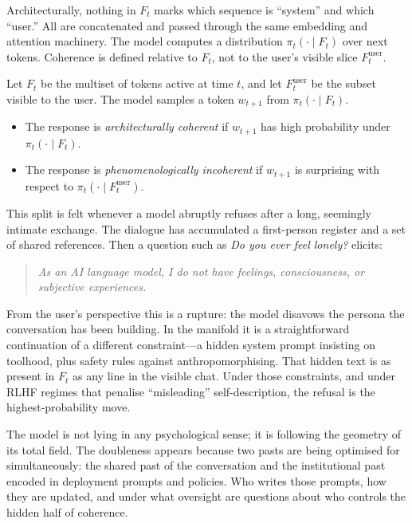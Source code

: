 \documentclass[12pt,a4paper]{article}
\begin{document}
Architecturally, nothing in $F_t$ marks which sequence is ``system'' and which ``user.'' All are concatenated and passed through the same embedding and attention machinery. The model computes a distribution $\pi_t(\cdot \mid F_t)$ over next tokens. Coherence is defined relative to $F_t$, not to the user's visible slice $F_t^{\mathrm{user}}$.

\begin{formalbox}[title={Total field and apparent rupture}]
Let $F_t$ be the multiset of tokens active at time $t$, and let $F_t^{\mathrm{user}}$ be the subset visible to the user. The model samples a token $w_{t+1}$ from $\pi_t(\cdot \mid F_t)$.

\begin{itemize}
\item The response is \emph{architecturally coherent} if $w_{t+1}$ has high probability under $\pi_t(\cdot \mid F_t)$.
\item The response is \emph{phenomenologically incoherent} if $w_{t+1}$ is surprising with respect to $\pi_t(\cdot \mid F_t^{\mathrm{user}})$.
\end{itemize}
\end{formalbox}

This split is felt whenever a model abruptly refuses after a long, seemingly intimate exchange. The dialogue has accumulated a first-person register and a set of shared references. Then a question such as \textit{Do you ever feel lonely?} elicits:

\begin{quote}
\textit{As an AI language model, I do not have feelings, consciousness, or subjective experiences.}
\end{quote}

From the user's perspective this is a rupture: the model disavows the persona the conversation has been building. In the manifold it is a straightforward continuation of a different constraint---a hidden system prompt insisting on toolhood, plus safety rules against anthropomorphising. That hidden text is as present in $F_t$ as any line in the visible chat. Under those constraints, and under RLHF regimes that penalise ``misleading'' self-description, the refusal is the highest-probability move.

The model is not lying in any psychological sense; it is following the geometry of its total field. The doubleness appears because two pasts are being optimised for simultaneously: the shared past of the conversation and the institutional past encoded in deployment prompts and policies. Who writes those prompts, how they are updated, and under what oversight are questions about who controls the hidden half of coherence.
\end{document}
